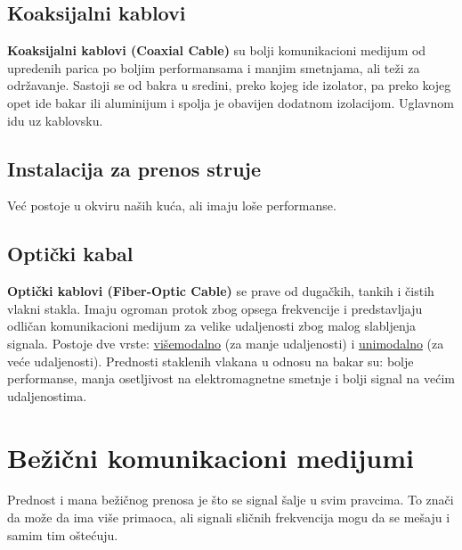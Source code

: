 \documentclass[a4paper]{article}
\begin{document}
    \subsection{Koaksijalni kablovi}
        \textbf{Koaksijalni kablovi (Coaxial Cable)} su bolji komunikacioni medijum od upredenih
        parica po boljim performansama i manjim smetnjama, ali teži za održavanje. 
        Sastoji se od bakra u sredini, preko kojeg ide
        izolator, pa preko kojeg opet ide bakar ili aluminijum i spolja je obavijen 
        dodatnom izolacijom. Uglavnom idu uz kablovsku.
    \subsection{Instalacija za prenos struje}
        Već postoje u okviru naših kuća, ali imaju loše performanse.
    \subsection{Optički kabal}
        \textbf{Optički kablovi (Fiber-Optic Cable)} se prave od dugačkih, tankih i čistih vlakni stakla. 
        Imaju ogroman protok zbog opsega frekvencije i predstavljaju odličan komunikacioni medijum 
        za velike udaljenosti zbog malog slabljenja signala. Postoje dve vrste: \underline{višemodalno}
        (za manje udaljenosti) i \underline{unimodalno} (za veće udaljenosti). Prednosti staklenih vlakana u 
        odnosu na bakar su: bolje performanse, manja osetljivost na elektromagnetne smetnje 
        i bolji signal na većim udaljenostima.

\section{Bežični komunikacioni medijumi}
        Prednost i mana bežičnog prenosa je što se signal šalje u svim pravcima. To znači da može da
        ima više primaoca, ali signali sličnih frekvencija mogu da se mešaju i samim tim oštećuju.\\
\end{document}

